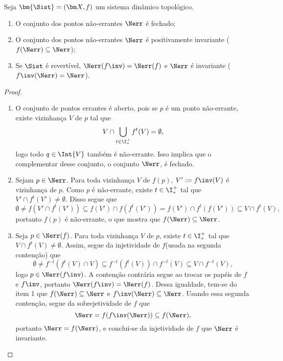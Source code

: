 \begin{proposition}
Seja $\bm{\Sist}=(\bm X,f)$ um sistema dinâmico topológico.
	\begin{enumerate}
	\item O conjunto dos pontos não-errantes $\Nerr$ é fechado;
	\item O conjunto dos pontos não-errantes $\Nerr$ é positivamente invariante ($f(\Nerr) \subseteq \Nerr$);
	\item Se $\Sist$ é revertível, $\Nerr(f\inv) = \Nerr(f)$ e $\Nerr$ é invariante ($f\inv(\Nerr) = \Nerr$).
	\end{enumerate}
\end{proposition}
\begin{proof}
	\begin{enumerate}
	\item O conjunto de pontos errantes é aberto, pois se $p$ é um ponto não-errante, existe vizinhança $V$ de $p$ tal que
	\begin{equation*}
	V \cap \bigcup_{t \in \I^+_*}f^t(V) = \emptyset,
	\end{equation*}
logo todo $q \in \Int{V}$ também é não-errante. Isso implica que o complementar desse conjunto, o conjunto $\Nerr$, é fechado.

	\item Sejam $p \in \Nerr$. Para toda vizinhança $V$ de $f(p)$, $V' := f\inv(V)$ é vizinhança de $p$. Como $p$ é não-errante, existe $t \in \I^+_*$ tal que $V' \cap f^t(V') \neq \emptyset$. Disso segue que
	\begin{equation*}
	\emptyset \neq f(V' \cap f^t(V')) \subseteq f(V') \cap f(f^t(V')) = f(V') \cap f^t(f(V')) \subseteq V \cap f^t(V),
	\end{equation*}
portanto $f(p)$ é não-errante, o que mostra que $f(\Nerr) \subseteq \Nerr$.

	\item Seja $p \in \Nerr(f)$. Para toda vizinhança $V$ de $p$, existe $t \in \I^+_*$ tal que $ V \cap f^t(V) \neq \emptyset$. Assim, segue da injetividade de $f$(usada na segunda contenção) que
	\begin{equation*}
	\emptyset \neq f^{-t}(f^t(V) \cap V) \subseteq f^{-t}(f^t(V)) \cap f^{-t}(V) \subseteq V \cap f^{-t}(V),
	\end{equation*}
logo $p \in \Nerr(f\inv)$. A contenção contrária segue ao trocar os papéis de $f$ e $f\inv$, portanto $\Nerr(f\inv) = \Nerr(f)$. Dessa igualdade, tem-se do item 1 que $f(\Nerr) \subseteq \Nerr$ e $f\inv(\Nerr) \subseteq \Nerr$. Usando essa segunda contenção, segue da sobrejetividade de $f$ que
	\begin{equation*}
	\Nerr = f(f\inv(\Nerr)) \subseteq f(\Nerr),
	\end{equation*}
portanto $\Nerr = f(\Nerr)$, e conclui-se da injetividade de $f$ que $\Nerr$ é invariante.
\qedhere
	\end{enumerate}
\end{proof}

